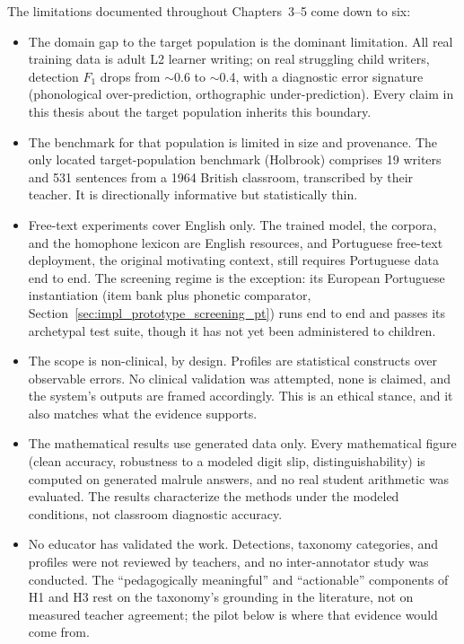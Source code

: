 The limitations documented throughout Chapters~3--5 come down to six:

\begin{itemize}
    \item The domain gap to the target population is the dominant limitation. All real training data is adult L2 learner writing; on real struggling child writers, detection $F_1$ drops from $\sim$0.6 to $\sim$0.4, with a diagnostic error signature (phonological over-prediction, orthographic under-prediction). Every claim in this thesis about the target population inherits this boundary.
    \item The benchmark for that population is limited in size and provenance. The only located target-population benchmark (Holbrook) comprises 19 writers and 531 sentences from a 1964 British classroom, transcribed by their teacher. It is directionally informative but statistically thin.
    \item Free-text experiments cover English only. The trained model, the corpora, and the homophone lexicon are English resources, and Portuguese free-text deployment, the original motivating context, still requires Portuguese data end to end. The screening regime is the exception: its European Portuguese instantiation (item bank plus phonetic comparator, Section~\ref{sec:impl_prototype_screening_pt}) runs end to end and passes its archetypal test suite, though it has not yet been administered to children.
    \item The scope is non-clinical, by design. Profiles are statistical constructs over observable errors. No clinical validation was attempted, none is claimed, and the system's outputs are framed accordingly. This is an ethical stance, and it also matches what the evidence supports.
    \item The mathematical results use generated data only. Every mathematical figure (clean accuracy, robustness to a modeled digit slip, distinguishability) is computed on generated malrule answers, and no real student arithmetic was evaluated. The results characterize the methods under the modeled conditions, not classroom diagnostic accuracy.
    \item No educator has validated the work. Detections, taxonomy categories, and profiles were not reviewed by teachers, and no inter-annotator study was conducted. The ``pedagogically meaningful'' and ``actionable'' components of H1 and H3 rest on the taxonomy's grounding in the literature, not on measured teacher agreement; the pilot below is where that evidence would come from.
\end{itemize}

